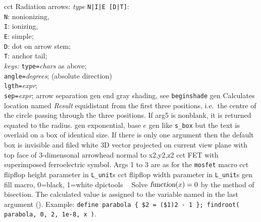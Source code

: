 %
  {cct}%
  { Radiation arrows: {\sl type} {\tt N|I|E [D|T]}:\\
  {\tt N}: nonionizing,\\
  {\tt I}: ionizing,\\
  {\tt E}: simple;\\
  {\tt D}: dot on arrow stem;\\
  {\tt T}: anchor tail;\\
  {\sl keys:} {\tt type=}{\sl chars} as above;\\
  {\tt angle=}{\sl degrees}; (absolute direction)\\
  {\tt lgth=}{\sl expr};\\
  {\tt sep=}{\sl expr}; arrow separation
  }%
%
  {gen}%
  {end gray shading, see {\tt beginshade}}%
%
  {gen}%
  {Calculates location named {\sl Result} equidistant from the first three
   positions, i.e.\ the centre of the circle passing through the three
   positions.  If arg5 is nonblank, it is returned equated to the radius.}%
%
  {gen}%
  {exponential, base $e$}%
%
%
%
  {gen}%
  {like {\tt s\_box} but the text is overlaid on a box of identical size.
   If there is only one argument then the default box
   is invisible and filed white
    }%
%
  {3D}%
  {vector projected on current view plane with top face
   of 3-dimensonal arrowhead normal to x2,y2,z2 }%
%
  {cct}%
  {FET with superimposed ferroelectric symbol. Args 1 to 3 are as for
   the {\tt mosfet} macro
    }%
%
  {cct}%
  {flipflop height parameter in {\tt L\_unit}s}%
%
  {cct}%
  {flipflop width parameter in {\tt L\_unit}s}%
%
  {gen}%
  {fill macro, 0=black, 1=white}%
%
  {dpictools}%
  {$\;\;$ Solve $\hbox{\sl function}(x) = 0$ by the method of 
   bisection.  The calculated value is assigned to the variable named in the
   last argument (). Example:
   {\tt define parabola \{ \$2 = (\$1)2 - 1 \};
   findroot( parabola, 0, 2, 1e-8, x )}. }%
